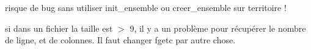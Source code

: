 
\begin{DoxyRefList}
\item[\label{bug__bug000002}%
\hypertarget{bug__bug000002}{}%
\-Membre \hyperlink{territoire_8c_a896662da2a34a834e9316b1d5985538b}{determine\-Territoire} (\-Plateau plateau, \hyperlink{structPosition}{\-Position} pos)]risque de bug sans utiliser init\-\_\-ensemble ou creer\-\_\-ensemble sur territoire !  
\item[\label{bug__bug000001}%
\hypertarget{bug__bug000001}{}%
\-Membre \hyperlink{matrice_8c_ad3b953551d15e015f4f3027ae2f259da}{matrice\-\_\-chargement} (\-F\-I\-L\-E $\ast$fichier)]si dans un fichier la taille est $>$ 9, il y a un problème pour récupérer le nombre de ligne, et de colonnes. \-Il faut changer fgetc par autre chose. 
\end{DoxyRefList}